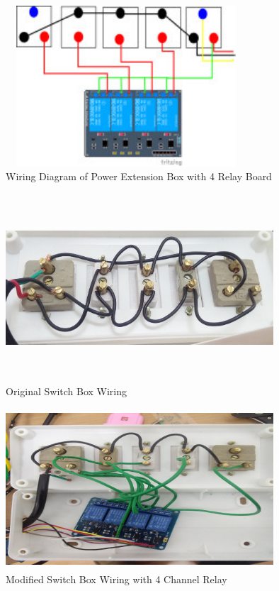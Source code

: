 \documentclass[12pt,a4paper]{article}
\begin{document}
\begin{flushleft}
\begin{figure}[h!]
    \centering
	\includegraphics[width=9cm, height=6cm]{Prog10/1.jpg}	
	\caption{Wiring Diagram of Power Extension Box with 4 Relay Board}
\end{figure}
\vspace{5mm}


\begin{figure}[h!]
    \centering
	\includegraphics[width=10cm, height=7cm]{Prog10/2.jpg}
	\caption{Original Switch Box Wiring}
\end{figure}
\vspace{5mm}

\begin{figure}[h!]
    \centering
	\includegraphics[width=10cm, height=6cm]{Prog10/3.png}
	\caption{Modified Switch Box Wiring with 4 Channel Relay}
\end{figure}
\vspace{5mm}


\end{flushleft}
\end{document}
